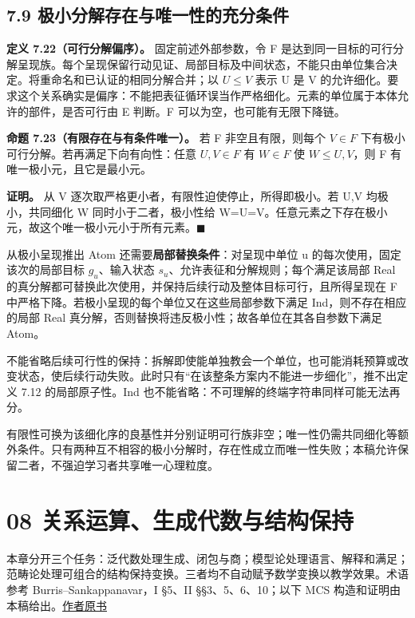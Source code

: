 \documentclass[UTF8,a4paper,zihao=-4,fontset=windows,openany]{ctexbook}
\newcommand{\mcsorigin}[1]{\par\noindent{\small\color{black!55}#1}\par\addvspace{0.8em}}
\begin{document}
\section{7.9 极小分解存在与唯一性的充分条件}
\textbf{定义 7.22（可行分解偏序）。} 固定前述外部参数，令 F 是达到同一目标的可行分解呈现族。每个呈现保留行动见证、局部目标及中间状态，不能只由单位集合决定。将重命名和已认证的相同分解合并；以 \(U\le V\) 表示 U 是 V 的允许细化。要求这个关系确实是偏序：不能把表征循环误当作严格细化。元素的单位属于本体允许的部件，是否可行由 E 判断。F 可以为空，也可能有无限下降链。

\textbf{命题 7.23（有限存在与有条件唯一）。} 若 F 非空且有限，则每个 \(V\in F\) 下有极小可行分解。若再满足下向有向性：任意 \(U,V\in F\) 有 \(W\in F\) 使 \(W\le U,V\)，则 F 有唯一极小元，且它是最小元。

\textbf{证明。} 从 V 逐次取严格更小者，有限性迫使停止，所得即极小。若 U,V 均极小，共同细化 W 同时小于二者，极小性给 W=U=V。任意元素之下存在极小元，故这个唯一极小元小于所有元素。\(\blacksquare\)

从极小呈现推出 Atom 还需要\textbf{局部替换条件}：对呈现中单位 u 的每次使用，固定该次的局部目标 \(g_u\)、输入状态 \(s_u\)、允许表征和分解规则；每个满足该局部 Real 的真分解都可替换此次使用，并保持后续行动及整体目标可行，且所得呈现在 F 中严格下降。若极小呈现的每个单位又在这些局部参数下满足 Ind，则不存在相应的局部 Real 真分解，否则替换将违反极小性；故各单位在其各自参数下满足 Atom。

不能省略后续可行性的保持：拆解即使能单独教会一个单位，也可能消耗预算或改变状态，使后续行动失败。此时只有“在该整条方案内不能进一步细化”，推不出定义 7.12 的局部原子性。Ind 也不能省略：不可理解的终端字符串同样可能无法再分。

有限性可换为该细化序的良基性并分别证明可行族非空；唯一性仍需共同细化等额外条件。只有两种互不相容的极小分解时，存在性成立而唯一性失败；本稿允许保留二者，不强迫学习者共享唯一心理粒度。

\clearpage\chapter{08 关系运算、生成代数与结构保持}
\mcsorigin{原章节：08-关系代数与结构.md}
本章分开三个任务：泛代数处理生成、闭包与商；模型论处理语言、解释和满足；范畴论处理可组合的结构保持变换。三者均不自动赋予数学变换以教学效果。术语参考 Burris–Sankappanavar，I §5、II §§3、5、6、10；以下 MCS 构造和证明由本稿给出。\href{https://www.math.uwaterloo.ca/\textasciitilde{}snburris/htdocs/ualg.html}{作者原书}
\end{document}
